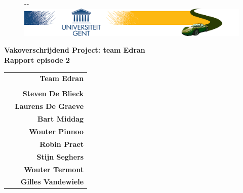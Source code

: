 \documentclass[11pt,a4paper,oneside]{article}
\begin{document}
\begin{titlepage}

\thispagestyle{fancy}
\fancyhf{}
\fancyfoot[L]{}
\begin{figure}[!ht]
  \begin{adjustwidth}{-\oddsidemargin-1in}{-\rightmargin}
    \centering
    \includegraphics[width=\paperwidth]{banner}
  \end{adjustwidth}
\end{figure}
\vspace{-0.2em}
\begin{center}
\vspace{5cm}
\Huge \textbf{Vakoverschrijdend Project: team Edran\\ Rapport episode 2}\\
\vspace{6.0cm}
\large
\begin{tabular}{L! {} R}
& {\LARGE\bf Team Edran} \\
& \\
& {\bf Steven De Blieck} \\
& {\bf Laurens De Graeve} \\
& {\bf Bart Middag} \\
& {\bf Wouter Pinnoo} \\
& {\bf Robin Praet} \\
& {\bf Stijn Seghers} \\
& {\bf Wouter Termont} \\
& {\bf Gilles Vandewiele} \\
\end{tabular}
\end{center}
\end{titlepage}
\newpage

\fancyheadoffset[RO,LE]{0in}

\fancyfoot[L]{}
\fancyfoot[C]{\thepage}
\pagestyle{fancy}
\tableofcontents
\newpage

\setcounter{section}{0}
\setcounter{subsection}{0}
\end{document}
